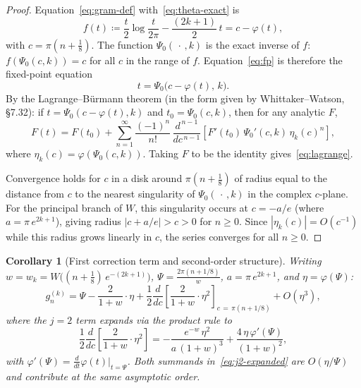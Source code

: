 \documentclass[11pt]{article}
\newtheorem{corollary}[theorem]{Corollary}
\theoremstyle{definition}
\begin{document}
\begin{proof}
Equation~\eqref{eq:gram-def} with~\eqref{eq:theta-exact} is
\begin{equation}
  f(t) \coloneqq \frac{t}{2}\log\frac{t}{2\pi}
    - \frac{(2k+1)}{2}\,t = c - \varphi(t),
  \label{eq:fp}
\end{equation}
with $c = \pi(n + \tfrac{1}{8})$.
The function $\Psi_0(\,\cdot\,,k)$ is the exact inverse of $f$:
$f(\Psi_0(c,k)) = c$ for all $c$ in the range of $f$.
Equation~\eqref{eq:fp} is therefore the fixed-point equation
\begin{equation}
  t = \Psi_0\!\bigl(c - \varphi(t),\,k\bigr).
  \label{eq:fp2}
\end{equation}
By the Lagrange--B\"urmann theorem (in the form given by
Whittaker--Watson, \S7.32): if $t = \Psi_0(c - \varphi(t),k)$
and $t_0 = \Psi_0(c,k)$, then for any analytic $F$,
\begin{equation}
  F(t) = F(t_0) + \sum_{n=1}^{\infty}\frac{(-1)^n}{n!}\,
    \frac{d^{\,n-1}}{dc^{\,n-1}}\!\left[
      F'(t_0)\,\Psi_0'(c,k)\,\eta_k(c)^n
    \right],
\end{equation}
where $\eta_k(c) = \varphi(\Psi_0(c,k))$. Taking $F$ to be the
identity gives~\eqref{eq:lagrange}.

Convergence holds for $c$ in a disk around $\pi(n+\tfrac{1}{8})$
of radius equal to the distance from $c$ to the nearest singularity
of $\Psi_0(\,\cdot\,,k)$ in the complex $c$-plane. For the principal
branch of $W$, this singularity occurs at $c = -a/e$ (where
$a = \pi\,e^{2k+1}$), giving radius $|c + a/e| > c > 0$ for $n \ge 0$.
Since $|\eta_k(c)| = O(c^{-1})$ while this radius grows linearly
in $c$, the series converges for all $n \ge 0$.
\end{proof}

\begin{corollary}[First correction term and second-order structure]
\label{cor:corrections}
Writing $w = w_k = W\!\bigl((n+\tfrac{1}{8})\,e^{-(2k+1)}\bigr)$,
$\Psi = \frac{2\pi(n+1/8)}{w}$, $a = \pi\,e^{2k+1}$,
and $\eta = \varphi(\Psi)$:
\begin{equation}
  g_n^{(k)} = \Psi
    - \frac{2}{1+w}\cdot\eta
    + \frac{1}{2}\frac{d}{dc}\!\left[\frac{2}{1+w}\cdot\eta^2\right]_{c\,=\,\pi(n+1/8)}
    + O\!\left(\eta^3\right),
  \label{eq:two-terms}
\end{equation}
where the $j = 2$ term expands via the product rule to
\begin{equation}
  \frac{1}{2}\frac{d}{dc}\!\left[\frac{2}{1+w}\cdot\eta^2\right]
  = -\frac{e^{-w}\,\eta^2}{a\,(1+w)^3}
    + \frac{4\,\eta\,\varphi'(\Psi)}{(1+w)^2},
  \label{eq:j2-expanded}
\end{equation}
with $\varphi'(\Psi) = \frac{d}{dt}\varphi(t)\big|_{t=\Psi}$. Both summands
in~\eqref{eq:j2-expanded} are $O(\eta/\Psi)$ and contribute at the same
asymptotic order.
\end{corollary}
\end{document}

